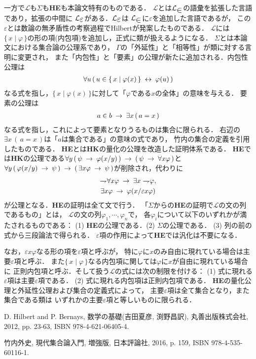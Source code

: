 \documentclass[twocolumn,10pt]{jsarticle}
\theoremstyle{mystyle}
\newcommand{\lang}[1]{\mathcal{L}_{\scalebox{1.2}{$#1$}}} %
\newcommand{\Set}[2]{\{\, #1 \mid #2\, \}} %
\newcommand{\negation}{\rightharpoondown\hspace{-0.25em}} %
\newcommand{\rarrow}{\hspace{0.25em}\rightarrow\hspace{0.25em}} %
\newcommand{\lrarrow}{\hspace{0.25em}\leftrightarrow\hspace{0.25em}} %
\begin{document}
	一方で$\mathcal{L}$も$\Sigma$も{\bf HE}も本論文特有のものである．
	$\mathcal{L}$とは$\lang{\in}$の語彙を拡張した言語であり，拡張の中間に
	$\lang{\varepsilon}$がある．$\lang{\varepsilon}$は
	$\lang{\in}$に$\varepsilon$を追加した言語であるが，
	この$\varepsilon$とは数論の無矛盾性の考察過程でHilbert\cite{Hilbert}が発案したものである．
	$\mathcal{L}$には$\Set{x}{\varphi}$の形の項(内包項)を追加し，正式に類が扱えるようになる．
	$\Sigma$とは本論文における集合論の公理系であり，
	$\Gamma$の「外延性」と「相等性」が類に対する言明に変更され，
	また「内包性」と「要素」の公理が新たに追加される．内包性公理は
	\begin{align}
		\forall u\, (\, u \in \Set{x}{\varphi(x)} \lrarrow \varphi(u)\, )
	\end{align}
	なる式を指し，$\Set{x}{\varphi(x)}$に対して「$\varphi$である$x$の全体」の意味を与える．
	要素の公理は
	\begin{align}
		a \in b \rarrow \exists x\, (\, a = x\, )
	\end{align}
	なる式を指し，これによって要素となりうるものは集合に限られる．
	右辺の$\exists x\, (\, a = x\, )$は「$a$は集合である」の意味の式であり，
	竹内\cite{TakeuchiSet}の集合の定義を引用したものである．
	{\bf HE}とは{\bf HK}の量化の公理を改造した証明体系である．
	{\bf HE}では{\bf HK}の公理である$\forall y\, (\, \psi \rarrow \varphi(x/y)\, )
	\rarrow (\, \psi \rarrow \forall x \varphi\, )$と
	$\forall y\, (\, \varphi(x/y) \rarrow \psi\, )
	\rarrow (\, \exists x \varphi \rarrow \psi\, )$が削除され，代わりに
	\begin{align}
		\begin{gathered}
			\negation \forall x \varphi \rarrow \exists x \negation \varphi, \\
			\exists x \varphi \rarrow \varphi(x/\varepsilon x \varphi)
		\end{gathered}
	\end{align}
	が公理となる．{\bf HE}の証明は全て文で行う．
	「$\Sigma$からの{\bf HE}の証明で$\mathcal{L}$の文の列であるもの」とは，
	$\mathcal{L}$の文の列$\varphi_{1},\cdots,\varphi_{n}$で，
	各$\varphi_{i}$について以下のいずれかが満たされるものである：
	(1) {\bf HE}の公理である．(2) $\Sigma$の公理である．
	(3) 列の前の式から三段論法で得られる．
	$\varepsilon$項の作用によって{\bf HE}では汎化は不要になる．
	
	なお，$\varepsilon x \varphi$なる形の項を$\varepsilon$項と呼ぶが，
	特に$\varphi$に$x$のみ自由に現れている場合は主要$\varepsilon$項と呼ぶ．
	また$\Set{x}{\varphi}$なる内包項に関しては$\varphi$に$x$が自由に現れている場合に
	正則内包項と呼ぶ．そして扱う$\mathcal{L}$の式には次の制限を付ける：
	(1) 式に現れる$\varepsilon$項は主要$\varepsilon$項である．
	(2) 式に現れる内包項は正則内包項である．
	{\bf HE}の量化公理と外延性公理および集合の定義式によって，
	主要$\varepsilon$項は全て集合となり，また集合である類は
	いずれかの主要$\varepsilon$項と等しいものに限られる．
	
	\begin{thebibliography}{数字}
		 D. Hilbert and P. Bernays, 数学の基礎(吉田夏彦, 渕野昌訳), 丸善出版株式会社, 2012, pp. 23-63, ISBN 978-4-621-06405-4.
	
		 竹内外史, 現代集合論入門, 増強版, 日本評論社, 2016, p. 159, ISBN 978-4-535-60116-1.
	\end{thebibliography}
\end{document}
